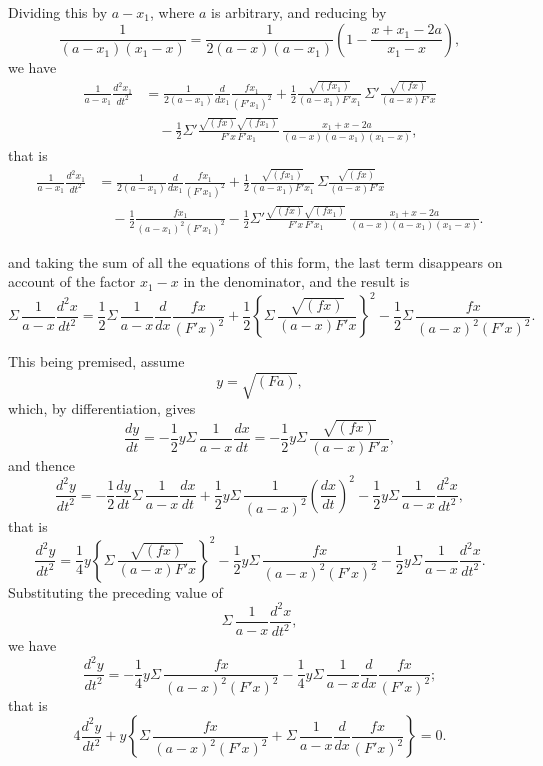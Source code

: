 \documentclass[11pt]{article}
\begin{document}
\medskip
Dividing this by $a - x_{1}$, where $a$ is arbitrary, and reducing by
\[
\frac{1}{(a-x_{1})(x_{1}-x)}
= \frac{1}{2(a-x)(a-x_{1})}
\left(1 - \frac{x+x_{1}-2a}{x_{1}-x}\right),
\]
we have
\begin{align*}
\frac{1}{a-x_{1}}\frac{d^{2}x_{1}}{d t^{2}}
&= \frac{1}{2(a-x_{1})}\frac{d}{d x_{1}}\frac{f x_{1}}{(F'x_{1})^{2}}
+ \frac{1}{2}\frac{\sqrt{(f x_{1})}}{(a-x_{1})F'x_{1}}\,
\Sigma'\frac{\sqrt{(f x)}}{(a-x)F'x} \\
&\quad - \frac{1}{2}\Sigma'
\frac{\sqrt{(f x)}\sqrt{(f x_{1})}}{F'x\,F'x_{1}}\,
\frac{x_{1}+x-2a}{(a-x)(a-x_{1})(x_{1}-x)},
\end{align*}
that is
\begin{align*}
\frac{1}{a-x_{1}}\frac{d^{2}x_{1}}{d t^{2}}
&= \frac{1}{2(a-x_{1})}\frac{d}{d x_{1}}\frac{f x_{1}}{(F'x_{1})^{2}}
+ \frac{1}{2}\frac{\sqrt{(f x_{1})}}{(a-x_{1})F'x_{1}}\,
\Sigma\frac{\sqrt{(f x)}}{(a-x)F'x} \\
&\quad - \frac{1}{2}\frac{f x_{1}}{(a-x_{1})^{2}(F'x_{1})^{2}}
- \frac{1}{2}\Sigma'
\frac{\sqrt{(f x)}\sqrt{(f x_{1})}}{F'x\,F'x_{1}}\,
\frac{x_{1}+x-2a}{(a-x)(a-x_{1})(x_{1}-x)}.
\end{align*}

\bigskip

and taking the sum of all the equations of this form, the last term disappears on
account of the factor $x_{1}-x$ in the denominator, and the result is
\[
\Sigma\,\frac{1}{a-x}\frac{d^{2}x}{d t^{2}}
= \frac{1}{2}\Sigma\,\frac{1}{a-x}\frac{d}{d x}\frac{f x}{(F'x)^{2}}
+ \frac{1}{2}\left\{\Sigma\,\frac{\sqrt{(f x)}}{(a-x)F'x}\right\}^{2}
- \frac{1}{2}\Sigma\,\frac{f x}{(a-x)^{2}(F'x)^{2}}.
\]

\medskip
This being premised, assume
\[
y = \sqrt{(F a)},
\]
which, by differentiation, gives
\[
\frac{d y}{d t}
= -\frac{1}{2}y\Sigma\,\frac{1}{a-x}\frac{d x}{d t}
= -\frac{1}{2}y\Sigma\,\frac{\sqrt{(f x)}}{(a-x)F'x},
\]
and thence
\[
\frac{d^{2}y}{d t^{2}}
= -\frac{1}{2}\frac{d y}{d t}\Sigma\,\frac{1}{a-x}\frac{d x}{d t}
+ \frac{1}{2}y\Sigma\,\frac{1}{(a-x)^{2}}\left(\frac{d x}{d t}\right)^{2}
- \frac{1}{2}y\Sigma\,\frac{1}{a-x}\frac{d^{2}x}{d t^{2}},
\]
that is
\[
\frac{d^{2}y}{d t^{2}}
= \frac{1}{4}y\left\{\Sigma\,\frac{\sqrt{(f x)}}{(a-x)F'x}\right\}^{2}
- \frac{1}{2}y\Sigma\,\frac{f x}{(a-x)^{2}(F'x)^{2}}
- \frac{1}{2}y\Sigma\,\frac{1}{a-x}\frac{d^{2}x}{d t^{2}}.
\]
Substituting the preceding value of
\[
\Sigma\,\frac{1}{a-x}\frac{d^{2}x}{d t^{2}},
\]
we have
\[
\frac{d^{2}y}{d t^{2}}
= -\frac{1}{4}y\Sigma\,\frac{f x}{(a-x)^{2}(F'x)^{2}}
- \frac{1}{4}y\Sigma\,\frac{1}{a-x}\frac{d}{d x}\frac{f x}{(F'x)^{2}};
\]
that is
\[
4\frac{d^{2}y}{d t^{2}}
+ y\left\{\Sigma\,\frac{f x}{(a-x)^{2}(F'x)^{2}}
+ \Sigma\,\frac{1}{a-x}\frac{d}{d x}\frac{f x}{(F'x)^{2}}\right\} = 0.
\]
\end{document}
